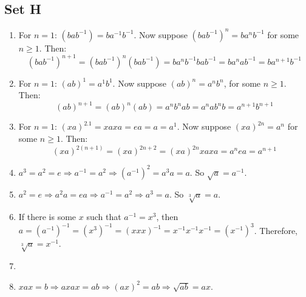 \subsection{Set H}
\begin{enumerate}
    \item For $n = 1$: $(bab^{-1}) = ba^{-1}b^{-1}$. Now suppose $(bab^{-1})^{n} = ba^nb^{-1}$ for some $n \geqslant 1$. Then:
        $$(bab^{-1})^{n + 1} = (bab^{-1})^{n}(bab^{-1}) = ba^{n}b^{-1}bab^{-1} = ba^nab^{-1} = ba^{n + 1}b^{-1}$$
    \item For $n = 1$: $(ab)^1 = a^1b^1$. Now suppose $(ab)^n = a^nb^n$, for some $n \geqslant 1$. Then:
        $$(ab)^{n + 1} = (ab)^n(ab) = a^nb^nab = a^nab^nb = a^{n + 1}b^{n + 1}$$
    \item For $n = 1$: $(xa)^{2.1} = xaxa = ea = a = a^1$. Now suppose $(xa)^{2n} = a^n$ for some $n \geqslant 1$. Then:
        $$(xa)^{2(n + 1)} = (xa)^{2n + 2} = (xa)^{2n}xaxa = a^nea = a^{n + 1}$$
    \item $a^3 = a^2 = e \Rightarrow a^{-1} = a^2 \Rightarrow (a^{-1})^2 = a^3a = a$. So $\sqrt{a} = a^{-1}$.
    \item $a^2 = e \Rightarrow a^2a = ea \Rightarrow a^{-1} = a^2 \Rightarrow a^3 = a$. So $\sqrt[3]{a} = a$.
    \item If there is some $x$ such that $a^{-1} = x^3$, then $a = (a^{-1})^{-1} = (x^3)^{-1} = (xxx)^{-1} = x^{-1}x^{-1}x^{-1} = (x^{-1})^3$. Therefore, $\sqrt[3]{a} = x^{-1}$.
    \item 
    \item $xax = b \Rightarrow axax = ab \Rightarrow (ax)^2 = ab \Rightarrow \sqrt{ab} = ax$.
\end{enumerate}
